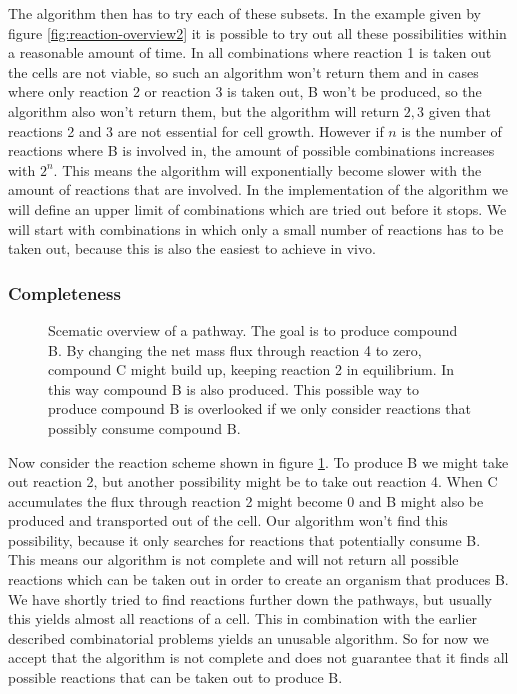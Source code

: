 \documentclass[12pt]{report}
\begin{document}
The algorithm then has to try each of these subsets.
In the example given by figure \ref{fig:reaction-overview2} it is possible to try out all these possibilities within a reasonable amount of time.
In all combinations where reaction 1 is taken out the cells are not viable, so such an algorithm won't return them and in cases where only reaction 2 or reaction 3 is taken out, B won't be produced, so the algorithm also won't return them, but the algorithm will return ${2,3}$ given that reactions 2 and 3 are not essential for cell growth.
However if $n$ is the number of reactions where B is involved in, the amount of possible combinations increases with $2^n$.
This means the algorithm will exponentially become slower with the amount of reactions that are involved.
In the implementation of the algorithm we will define an upper limit of combinations which are tried out before it stops. We will start with combinations in which only a small number of reactions has to be taken out, because this is also the easiest to achieve in vivo.

\subsubsection{Completeness}
\begin{figure}[hbtp]
  \centering
     
      \caption{Scematic overview of a pathway. The goal is to produce compound B. By changing the net mass flux through reaction 4 to zero, compound C might build up, keeping reaction 2 in equilibrium. In this way compound B is also produced. This possible way to produce compound B is overlooked if we only consider reactions that possibly consume compound B.}
  \label{fig:reaction-overview3}
\end{figure}
Now consider the reaction scheme shown in figure \ref{fig:reaction-overview3}.
To produce B we might take out reaction 2, but another possibility might be to take out reaction 4.
When C accumulates the flux through reaction 2 might become 0 and B might also be produced and transported out of the cell.
Our algorithm won't find this possibility, because it only searches for reactions that potentially consume B.
This means our algorithm is not complete and will not return all possible reactions which can be taken out in order to create an organism that produces B.
We have shortly tried to find reactions further down the pathways, but usually this yields almost all reactions of a cell.
This in combination with the earlier described combinatorial problems yields an unusable algorithm.
So for now we accept that the algorithm is not complete and does not guarantee that it finds all possible reactions that can be taken out to produce B.
\end{document}
